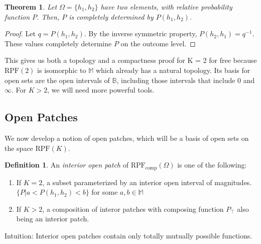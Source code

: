 \documentclass[twoside]{article}
\theoremstyle{plain}%
\newtheorem{theorem}{Theorem}[section]
\theoremstyle{definition}
\newtheorem{definition}{Definition}[section]
\theoremstyle{remark}
\begin{document}
\begin{theorem}
Let \(\Omega = \{h_1, h_2\}\) have two elements, with relative probability function \(P\). Then, \(P\) is completely determined by \(P(h_1, h_2)\).
\end{theorem}

\begin{proof}
Let \(q = P(h_1, h_2)\). By the inverse symmetric property, \(P(h_2, h_1) = q^{-1}\). These values completely determine \(P\) on the outcome level.
\end{proof}

This gives us both a topology and a compactness proof for K = 2 for free because \(\text{RPF}(2)\) is isomorphic to \(\mathbb{M}\) which already has a natural topology. Its basis for open sets are the open intervals of \(\mathbb{B}\), including those intervals that include 0 and \(\infty\). For \(K > 2\), we will need more powerful tools.

\subsection{Open Patches}

We now develop a notion of open patches, which will be a basis of open sets on the space \(\text{RPF}(K)\).

\begin{definition}
An \textit{interior open patch} of \(\text{RPF}_{\text{comp}}(\Omega)\) is one of the following:

\begin{enumerate}
  \item If \(K = 2\), a subset parameterized by an interior open interval of magnitudes. \(\{P | a < P(h_1, h_2) < b\}\) for some \(a, b \in \mathbb{M}\) 
  \item If \(K > 2\), a composition of interor patches with composing function \(P_{\top}\) also being an interior patch.
\end{enumerate}
\end{definition}

Intuition: Interior open patches contain only totally mutually possible functions.
\end{document}
